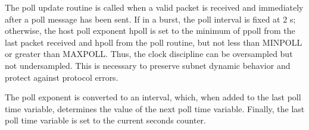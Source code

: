 The poll update routine is called when a valid packet is received and
immediately after a poll message has been sent. If in a burst, the
poll interval is fixed at 2 s; otherwise, the host poll exponent
hpoll is set to the minimum of ppoll from the last packet received
and hpoll from the poll routine, but not less than MINPOLL or greater
than MAXPOLL. Thus, the clock discipline can be oversampled but not
undersampled. This is necessary to preserve subnet dynamic behavior
and protect against protocol errors.

The poll exponent is converted to an interval, which, when added to
the last poll time variable, determines the value of the next poll
time variable. Finally, the last poll time variable is set to the
current seconds counter.

